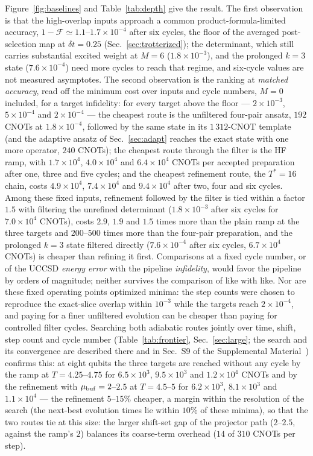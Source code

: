 \documentclass[
  aps,            %
  prc,            %
  reprint,        %
  superscriptaddress,
  floatfix,
  nofootinbib
]{revtex4-2}
\newcommand{\SM}{Supplemental Material~\cite{SM}}
\begin{document}
Figure~\ref{fig:baselines} and Table~\ref{tab:depth} give the result.  The
first observation is that the high-overlap inputs approach a common
product-formula-limited accuracy, $1-\mathcal F\simeq1.1$--$1.7\times10^{-4}$
after six cycles, the floor of the averaged post-selection map at
$\delta t=0.25$ (Sec.~\ref{sec:trotterized}); the determinant, which still
carries substantial excited weight at $M=6$ ($1.8\times10^{-3}$), and the
prolonged $k=3$ state ($7.6\times10^{-4}$) need more cycles to reach that
regime, and six-cycle values are not measured asymptotes.  The second
observation is the ranking at \emph{matched accuracy}, read off the minimum
cost over inputs and cycle numbers, $M=0$ included, for a target
infidelity: for every target above the floor --- $2\times10^{-3}$,
$5\times10^{-4}$ and $2\times10^{-4}$ --- the cheapest route is the
unfiltered four-pair ansatz, $192$ CNOTs at $1.8\times10^{-4}$, followed by
the same state in its $1\,312$-CNOT template (and the adaptive ansatz of
Sec.~\ref{sec:adapt} reaches the exact state with one more operator, $240$
CNOTs); the cheapest route through the
filter is the HF ramp, with $1.7\times10^{4}$, $4.0\times10^{4}$ and
$6.4\times10^{4}$ CNOTs per accepted preparation after one, three and five
cycles; and the cheapest refinement route, the $T^{*}=16$ chain, costs
$4.9\times10^{4}$, $7.4\times10^{4}$ and $9.4\times10^{4}$ after two, four
and six cycles.  Among these fixed inputs, refinement followed by the
filter is tied within a factor $1.5$ with filtering the unrefined
determinant ($1.8\times10^{-3}$ after six cycles for $7.0\times10^{4}$
CNOTs), costs $2.9$, $1.9$ and $1.5$ times more than the plain ramp at the
three targets and $200$--$500$ times more than the four-pair preparation,
and the prolonged $k=3$ state filtered directly ($7.6\times10^{-4}$ after
six cycles, $6.7\times10^{4}$ CNOTs) is cheaper than refining it first.
Comparisons at a fixed cycle number, or of the UCCSD \emph{energy error}
with the pipeline \emph{infidelity}, would favor the pipeline by orders of
magnitude; neither survives the comparison of like with like.  Nor are
these fixed operating points optimized minima: the step counts were chosen to reproduce the
exact-slice overlap within $10^{-3}$ while the targets reach
$2\times10^{-4}$, and paying for a finer unfiltered evolution can be
cheaper than paying for controlled filter cycles.  Searching both
adiabatic routes jointly over time, shift, step count and cycle number
(Table~\ref{tab:frontier}, Sec.~\ref{sec:large}; the search and its
convergence are described there and in Sec.~S9 of the \SM{}) confirms
this: at eight qubits the three targets are reached without any cycle by
the ramp at $T=4.25$--$4.75$ for $6.5\times10^{3}$, $9.5\times10^{3}$ and
$1.2\times10^{4}$ CNOTs and by the refinement with $\mu_{\rm buf}=2$--$2.5$
at $T=4.5$--$5$ for $6.2\times10^{3}$, $8.1\times10^{3}$ and
$1.1\times10^{4}$ --- the refinement $5$--$15\%$ cheaper, a margin within
the resolution of the search (the next-best evolution times lie within
$10\%$ of these minima), so that the two routes tie at this size: the
larger shift-set gap of the projector path ($2$--$2.5$, against the ramp's
$2$) balances its coarse-term overhead ($14$ of $310$ CNOTs per step).
\end{document}
